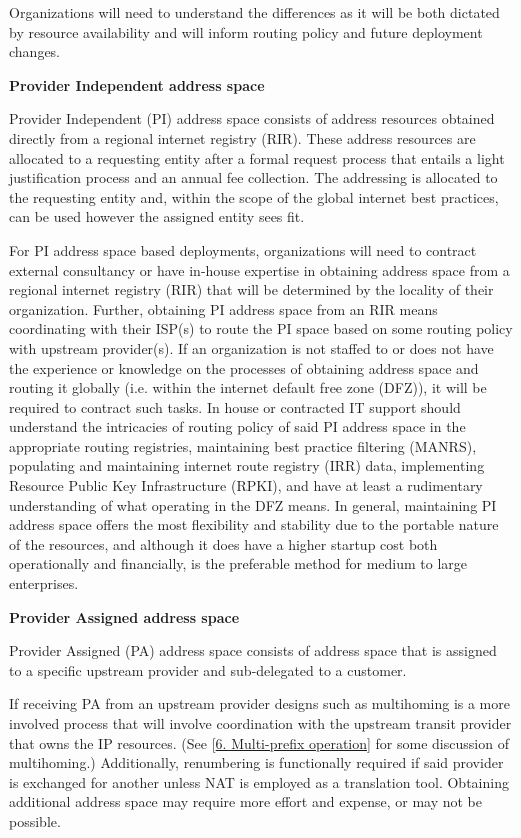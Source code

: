 \documentclass[
]{article}
\begin{document}
Organizations will need to understand the differences as it will be both
dictated by resource availability and will inform routing policy and
future deployment changes.

\textbf{Provider Independent address space}

Provider Independent (PI) address space consists of address resources
obtained directly from a regional internet registry (RIR). These address
resources are allocated to a requesting entity after a formal request
process that entails a light justification process and an annual fee
collection. The addressing is allocated to the requesting entity and,
within the scope of the global internet best practices, can be used
however the assigned entity sees fit.

For PI address space based deployments, organizations will need to
contract external consultancy or have in-house expertise in obtaining
address space from a regional internet registry (RIR) that will be
determined by the locality of their organization. Further, obtaining PI
address space from an RIR means coordinating with their ISP(s) to route
the PI space based on some routing policy with upstream provider(s). If
an organization is not staffed to or does not have the experience or
knowledge on the processes of obtaining address space and routing it
globally (i.e. within the internet default free zone (DFZ)), it will be
required to contract such tasks. In house or contracted IT support
should understand the intricacies of routing policy of said PI address
space in the appropriate routing registries, maintaining best practice
filtering (MANRS), populating and maintaining internet route registry
(IRR) data, implementing Resource Public Key Infrastructure (RPKI), and
have at least a rudimentary understanding of what operating in the DFZ
means. In general, maintaining PI address space offers the most
flexibility and stability due to the portable nature of the resources,
and although it does have a higher startup cost both operationally and
financially, is the preferable method for medium to large enterprises.

\textbf{Provider Assigned address space}

Provider Assigned (PA) address space consists of address space that is
assigned to a specific upstream provider and sub-delegated to a
customer.

If receiving PA from an upstream provider designs such as multihoming is
a more involved process that will involve coordination with the upstream
transit provider that owns the IP resources. (See
{[}\hyperref[multi-prefix-operation]{6. Multi-prefix operation}{]} for
some discussion of multihoming.) Additionally, renumbering is
functionally required if said provider is exchanged for another unless
NAT is employed as a translation tool. Obtaining additional address
space may require more effort and expense, or may not be possible.
\end{document}
